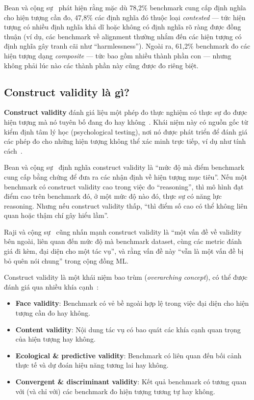 Bean và cộng sự~\cite{measuring_what_matters} phát hiện rằng mặc dù 78,2\% benchmark cung cấp định nghĩa cho hiện tượng cần đo, 47,8\% các định nghĩa đó thuộc loại \textit{contested} --- tức hiện tượng có nhiều định nghĩa khả dĩ hoặc không có định nghĩa rõ ràng được đồng thuận (ví dụ, các benchmark về alignment thường nhắm đến các hiện tượng có định nghĩa gây tranh cãi như ``harmlessness''). Ngoài ra, 61,2\% benchmark đo các hiện tượng dạng \textit{composite} --- tức bao gồm nhiều thành phần con --- nhưng không phải lúc nào các thành phần này cũng được đo riêng biệt.

\subsection{Construct validity là gì?}
\label{sec:what_is_cv}

\textbf{Construct validity} đánh giá liệu một phép đo thực nghiệm có thực sự đo được hiện tượng mà nó tuyên bố đang đo hay không~\cite{measuring_what_matters}. Khái niệm này có nguồn gốc từ kiểm định tâm lý học (psychological testing), nơi nó được phát triển để đánh giá các phép đo cho những hiện tượng không thể xác minh trực tiếp, ví dụ như tính cách~\cite{measuring_what_matters}.

Bean và cộng sự~\cite{measuring_what_matters} định nghĩa construct validity là ``mức độ mà điểm benchmark cung cấp bằng chứng để đưa ra các nhận định về hiện tượng mục tiêu''. Nếu một benchmark có construct validity cao trong việc đo ``reasoning'', thì mô hình đạt điểm cao trên benchmark đó, ở một mức độ nào đó, thực sự có năng lực reasoning. Nhưng nếu construct validity thấp, ``thì điểm số cao có thể không liên quan hoặc thậm chí gây hiểu lầm''.

Raji và cộng sự~\cite{everything_benchmark} cũng nhấn mạnh construct validity là ``một vấn đề về validity bên ngoài, liên quan đến mức độ mà benchmark dataset, cùng các metric đánh giá đi kèm, đại diện cho một tác vụ'', và rằng vấn đề này ``vẫn là một vấn đề bị bỏ quên nói chung'' trong cộng đồng ML.

Construct validity là một khái niệm bao trùm (\textit{overarching concept}), có thể được đánh giá qua nhiều khía cạnh~\cite{measuring_what_matters}:

\begin{itemize}
    \item \textbf{Face validity}: Benchmark có vẻ bề ngoài hợp lệ trong việc đại diện cho hiện tượng cần đo hay không.
    \item \textbf{Content validity}: Nội dung tác vụ có bao quát các khía cạnh quan trọng của hiện tượng hay không.
    \item \textbf{Ecological \& predictive validity}: Benchmark có liên quan đến bối cảnh thực tế và dự đoán hiệu năng tương lai hay không.
    \item \textbf{Convergent \& discriminant validity}: Kết quả benchmark có tương quan với (và chỉ với) các benchmark đo hiện tượng tương tự hay không.
\end{itemize}

